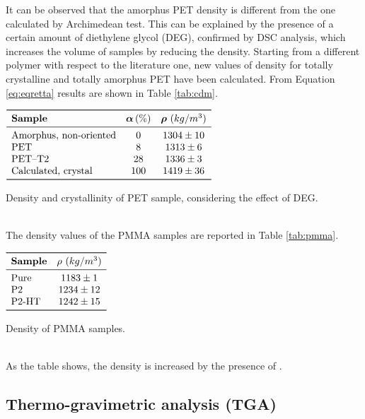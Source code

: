 \documentclass[a4paper, 11pt]{article}
\begin{document}
It can be observed that the amorphus PET density is different from the one calculated by Archimedean test. This can be explained by the presence of a certain amount of diethylene glycol (DEG), confirmed by DSC analysis, which increases the volume of samples by reducing the density. Starting from a different polymer with respect to the literature one, new values of density for totally crystalline and totally amorphus PET have been calculated. From Equation \ref{eq:eqretta} results are shown in Table \ref{tab:cdm}.
\begin{table}[htp]
\centering
$
\begin{array}{lcc}
\toprule
\textbf{Sample} & \boldsymbol{\alpha}\,(\%) & \boldsymbol{\rho}\,\,({kg/m^{3}})\\
\midrule
\text{Amorphus, non-oriented} & 0 & 1304 \pm 10\\
\text{PET} & 8 & 1313 \pm 6\\
\text{PET–T2} & 28 & 1336 \pm 3\\
\text{Calculated, crystal} & 100 & 1419 \pm 36\\
\bottomrule
\end{array}
$
\caption{Density and crystallinity of PET sample, considering the effect of DEG.}
\label{tab:cdm}
\end{table}\\
\newpage
The density values of the PMMA samples are reported in Table \ref{tab:pmma}.
\begin{table}[htp]
\centering
$
\begin{array}{lc}
\toprule
\textbf{Sample} & \mathbf{\rho}\,\,({kg/m^{3}})\\
\midrule
\text{Pure} & 1183 \pm 1\\
\text{P2} & 1234 \pm 12\\
\text{P2-HT} & 1242 \pm 15\\
\bottomrule
\end{array}
$
\caption{Density of PMMA samples.}
\label{tab:pmma}
\end{table}\\
As the table shows, the density is increased by the presence of .

\subsection{Thermo-gravimetric analysis (TGA)}
\end{document}
